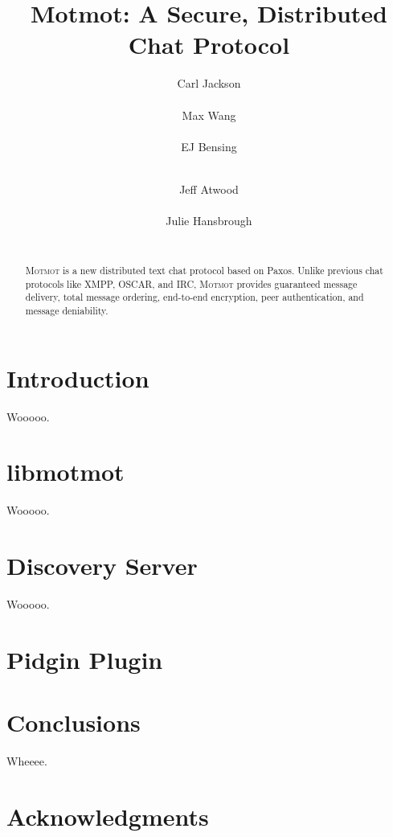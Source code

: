 \documentclass{sig-alternate}
\newcommand\Motmot{\textsc{Motmot}\xspace}
\begin{document}

\title{Motmot: A Secure, Distributed Chat Protocol}


%
\author{
  \alignauthor
  Carl Jackson \\
     \\
  \alignauthor
  Max Wang \\
     \\
  \alignauthor
  EJ Bensing \\
     \\
  \and
  \alignauthor
  Jeff Atwood \\
     \\
  \alignauthor
  Julie Hansbrough \\
     \\
}

\maketitle

\begin{abstract}

\Motmot is a new distributed text chat protocol based on Paxos. Unlike previous
chat protocols like XMPP, OSCAR, and IRC, \Motmot provides guaranteed message
delivery, total message ordering, end-to-end encryption, peer authentication,
and message deniability.

\end{abstract}

\section{Introduction}

Wooooo.

\section{libmotmot}

Wooooo.

\section{Discovery Server}

Wooooo.

\section{Pidgin Plugin}

\section{Conclusions}

Wheeee.

\section{Acknowledgments}

\end{document}
